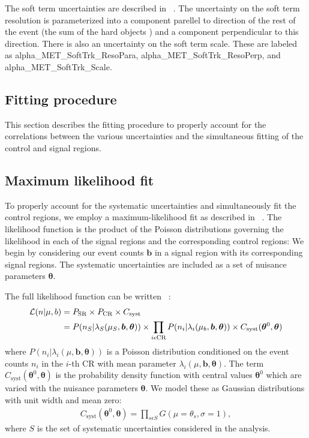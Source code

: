 The \met soft term uncertainties are described in ~\cite{PERF-2014-04,ATL-PHYS-PUB-2015-023,ATL-PHYS-PUB-2015-027}.
The uncertainty on the \met soft term resolution is parameterized into a component parellel to direction of the rest of the event (the sum of the hard objects \pt) and a component perpendicular to this direction.
There is also an uncertainty on the \met soft term scale.
These are labeled as alpha\_MET\_SoftTrk\_ResoPara, alpha\_MET\_SoftTrk\_ResoPerp, and alpha\_MET\_SoftTrk\_Scale.

\subsection{Fitting procedure}

This section describes the fitting procedure to properly account for the correlations between the various uncertainties and the simultaneous fitting of the control and signal regions.

\subsection{Maximum likelihood fit}

To properly account for the systematic uncertainties and simultaneously fit the control regions, we employ a maximum-likelihood fit as described in ~\cite{Baak:2014wma}.
The likelihood function \Lagr is the product of the Poisson distributions governing the likelihood in each of the signal regions and the corresponding control regions:
We begin by considering our event counts  $\bm{b}$ in a signal region with its corresponding signal regions.
The systematic uncertainties are included as a set of nuisance parameters $\bm{\theta}$.

The full likelihood function can be written ~\cite{Baak:2014wma}:
\begin{align}
\mathcal{L}(n | \mu, b) &= P_{\mathrm{SR}} \times P_{\mathrm{CR}} \times C_{\mathrm{syst}} \\
                  &= P(n_S | \lambda_S(\mu_{S},  \bm{b}, \bm{\theta} ) ) \times
                     \prod_{i \epsilon \text{CR}}  P(n_i | \lambda_i(\mu_b , \bm{b}, \bm{\theta}))
                     \times C_{\text{syst}}(\bm{\theta}^0 , \bm{\theta})
\end{align}
where $P(n_i | \lambda_i(\mu , \bm{b}, \bm{\theta}))$ is a Poisson distribution conditioned on the event counts $n_i$ in the $i$-th CR with mean parameter $\lambda_i(\mu , \bm{b}, \bm{\theta})$.
The term $C_{\text{syst}}(\bm{\theta}^0 , \bm{\theta})$ is the probability density function with central values $\bm{\theta}^0$ which are varied with the nuisance parameters $\bm{\theta}$.
We model these as Gaussian distributions with unit width and mean zero:
\begin{align}
C_{\text{syst}}(\bm{\theta}^0 , \bm{\theta}) = \prod_{s\epsilon S} G(\mu = \theta_s, \sigma = 1),
\end{align}
where $S$ is the set of systematic uncertainties considered in the analysis.

